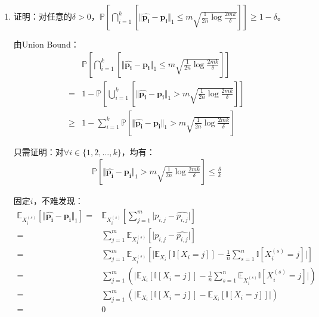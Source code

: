 \documentclass[12pt, a4paper]{article}
\newcommand{\expect}{{\mathbb{E}}}
\newcommand{\unit}{{\mathbb{I}}}
\newcommand{\prob}{{\mathbb{P}}}
\begin{document}
    \begin{enumerate}

    \item 证明：对任意的$\delta > 0$，$\prob[\bigcap_{i = 1}^{k} [\Vert \bm{\hat{p_i}} - \bm{p_i} \Vert_1 \le m \sqrt{\frac{1}{2n} \log \frac{2 m k}{\delta}}]] \ge 1 - \delta$。

        由Union Bound：
        \begin{align*}
        &\prob[\bigcap_{i = 1}^{k} [\Vert \bm{\hat{p_i}} - \bm{p_i} \Vert_1 \le m \sqrt{\frac{1}{2n} \log \frac{2 m k}{\delta}}]] \\
        =& 1 - \prob[\bigcup_{i = 1}^{k} [\Vert \bm{\hat{p_i}} - \bm{p_i} \Vert_1 > m \sqrt{\frac{1}{2n} \log \frac{2 m k}{\delta}}]] \\
        \ge& 1 - \sum_{i = 1}^{k} \prob[\Vert \bm{\hat{p_i}} - \bm{p_i} \Vert_1 > m \sqrt{\frac{1}{2n} \log \frac{2 m k}{\delta}}]
        \end{align*}

        只需证明：对$\forall i \in \{1, 2, ..., k\}$，均有：
        \begin{align*}
        \prob[\Vert \bm{\hat{p_i}} - \bm{p_i} \Vert_1 > m \sqrt{\frac{1}{2n} \log \frac{2 m k}{\delta}}] \le \frac{\delta}{k}
        \end{align*}

        固定$i$，不难发现：
        \begin{align*}
        \expect_{X_i^{(s)}}[\Vert \bm{\hat{p_i}} - \bm{p_i} \Vert_1]
        =& \expect_{X_i^{(s)}}[\sum_{j = 1}^{m} \vert p_{i, j} - \hat{p_{i, j}} \vert] \\
        =& \sum_{j = 1}^{m} \expect_{X_i^{(s)}}[\vert p_{i, j} - \hat{p_{i, j}} \vert] \\
        =& \sum_{j = 1}^{m} \expect_{X_i^{(s)}}[\vert \expect_{X_i}[\unit[X_i = j]] - \frac{1}{n} \sum_{s = 1}^{n} \unit[X_i^{(s)} = j] \vert] \\
        =& \sum_{j = 1}^{m} (\vert \expect_{X_i}[\unit[X_i = j]] - \frac{1}{n} \sum_{s = 1}^{n} \expect_{X_i^{(s)}} \unit[X_i^{(s)} = j] \vert) \\
        =& \sum_{j = 1}^{m} (\vert \expect_{X_i}[\unit[X_i = j]] -  \expect_{X_i}[\unit[X_i = j]] \vert) \\
        =& 0
        \end{align*}


\end{enumerate}
\end{document}
